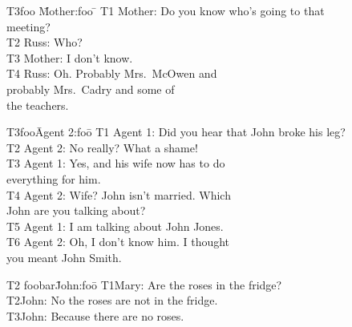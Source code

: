 {\newpage
\clearpage
\samepage \begin{figure}\small{
\begin{tabbing}
T3foo \= Mother:foo \= \kill
T1 \> Mother: \> Do you know who's going to that \\ 
\>\>meeting? \\ 
T2 \> Russ: \> Who? \\ 
T3 \> Mother: \> I don't know. \\ 
T4 \> Russ: \> Oh. Probably Mrs.~McOwen and \\ 
\>\>probably Mrs.~Cadry and some of \\ 
\>\>the teachers.
\end{tabbing}
}
 \label{mcroy}

\end{figure}
}

{\newpage
\clearpage
\samepage \begin{figure}\small{
\begin{tabbing}
T3foo\= Agent 2:foo\= \kill
T1 \> Agent 1: \> Did you hear that John broke his leg? \\ 
T2 \> Agent 2: \> No really? What a shame! \\ 
T3 \> Agent 1: \> Yes, and his wife now has to do\\ 
\>\> everything for him. \\ 
T4 \> Agent 2: \> Wife? John isn't married. Which \\ 
\>\>John are you talking about? \\ 
T5 \> Agent 1: \> I am talking about John Jones.\\ 
T6 \> Agent 2: \> Oh, I don't know him. I thought \\ 
\>\>you meant John Smith.\\ 
\end{tabbing}
}
\label{miller}
\end{figure}
}

{\newpage
\clearpage
\samepage \begin{figure}[b]
\small{
\begin{tabbing}
T2 foobar\=John:foo\= \kill
T1\>Mary: \> Are the roses in the fridge?\\ 
T2\>John: \> No the roses are not in the fridge. \\ 
T3\>John: \> Because there are no roses.
\end{tabbing}
}
\label{presup}
\end{figure}
}

